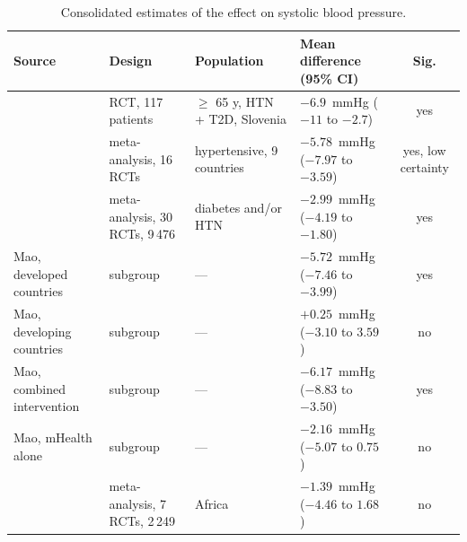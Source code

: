 \documentclass[12pt,a4paper,oneside]{report}
\begin{document}
\begin{table}[htbp]
\centering\footnotesize
\caption{Consolidated estimates of the effect on systolic blood pressure.}\label{tab:sbp-synthesis}
\begin{tabularx}{\textwidth}{@{}>{\raggedright\arraybackslash}p{3.2cm} >{\raggedright\arraybackslash}p{3.0cm} >{\raggedright\arraybackslash}X >{\raggedright\arraybackslash}p{3.3cm} c@{}}
\toprule
\textbf{Source} & \textbf{Design} & \textbf{Population} & \textbf{Mean difference (95\% CI)} & \textbf{Sig.} \\
\midrule
\textcite{mihevc2025} & RCT, 117 patients & $\geq$ 65 y, HTN + T2D, Slovenia & $-6.9$~mmHg ($-11$ to $-2.7$) & yes \\
\textcite{zhou2024} & meta-analysis, 16 RCTs & hypertensive, 9 countries & $-5.78$~mmHg ($-7.97$ to $-3.59$) & yes, low certainty \\
\textcite{mao2020} & meta-analysis, 30 RCTs, 9\,476 & diabetes and/or HTN & $-2.99$~mmHg ($-4.19$ to $-1.80$) & yes \\
Mao, developed countries & subgroup & --- & $-5.72$~mmHg ($-7.46$ to $-3.99$) & yes \\
Mao, developing countries & subgroup & --- & $+0.25$~mmHg ($-3.10$ to $3.59$) & no \\
Mao, combined intervention & subgroup & --- & $-6.17$~mmHg ($-8.83$ to $-3.50$) & yes \\
Mao, mHealth alone & subgroup & --- & $-2.16$~mmHg ($-5.07$ to $0.75$) & no \\
\textcite{aovare2023} & meta-analysis, 7 RCTs, 2\,249 & Africa & $-1.39$~mmHg ($-4.46$ to $1.68$) & no \\
\bottomrule
\end{tabularx}
\end{table}
\end{document}
